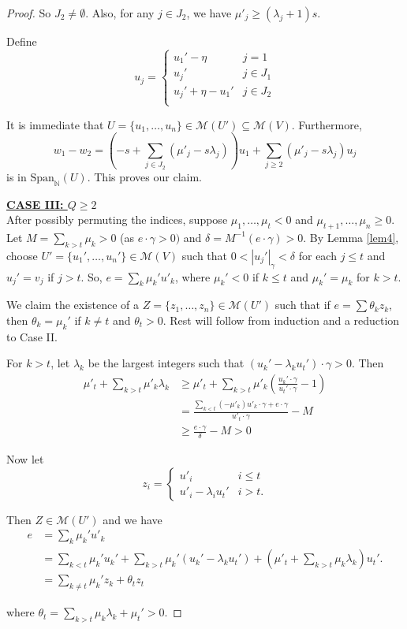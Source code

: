 \documentclass[notitlepage, 10pt]{article}
\theoremstyle{defin}
\theoremstyle{theo}
\theoremstyle{rema}
\newcommand{\N}{\mathbb{N}}
\newcommand{\cM}{\mathcal{M}}
\begin{document}
\begin{proof}
So $J_2\neq \emptyset$. Also, for any $j\in J_2$, we have $\mu'_j \geq (\lambda_j+1)s$.

Define
$$u_j = \begin{cases}
    u_1' -\eta & j=1 \\
    u_j' & j\in J_1\\
    u_j'+\eta - u_1' & j\in J_2 \\
\end{cases}$$

It is immediate that $U =\{u_1,\ldots, u_n\} \in \cM(U')\subseteq \cM(V)$. Furthermore, 
$$w_1 - w_2 = \left(-s+\sum_{j\in J_2} (\mu'_j  - s\lambda_j)\right)  u_1 +\sum_{j\geq 2} (\mu'_j  - s\lambda_j)u_j$$
is in $\mathrm{Span}_\N(U)$. This proves our claim.

\underline{\textbf{CASE III: $Q\geq 2$}} \\
After possibly permuting the indices, suppose $\mu_1,\ldots, \mu_t<0$ and $\mu_{t+1},\ldots, \mu_n\geq 0$. Let $M=\sum_{k>t}\mu_k>0$ (as $e\cdot \gamma>0)$ and $\delta = {M}^{-1}(e\cdot \gamma)>0$. By Lemma \ref{lem4}, choose $U'=\{u_1',\ldots,u_n'\}\in \cM(V)$ such that $0<|u_j'|_\gamma<\delta$ for each $j\leq t$ and $u_j'=v_j$ if $j>t$. So, $e = \sum_k \mu_k'u'_k$, where $\mu_k'<0$ if $k\leq t$ and $\mu_k'=\mu_k$ for $k>t$.

We claim the existence of a $Z =\{z_1,\ldots,z_n\} \in \cM(U')$ such that if 
$e = \sum \theta_k z_k$, then $\theta_k=\mu_k'$ if $k\neq t$ and $\theta_t > 0$. Rest will follow from induction and a reduction to Case II.

For $k>t$, let $\lambda_k$ be the largest integers such that $(u_k' - \lambda_k u_t')\cdot \gamma >0$. Then
\begin{align*}
    \mu'_t+\sum_{k>t} \mu'_k\lambda_k &\geq \mu'_t+\sum_{k>t} \mu'_k\left(\frac{u_k'\cdot \gamma}{u_t'\cdot \gamma}-1\right) \\
    &= \frac{\sum_{k<t} (-\mu'_k)u'_k\cdot \gamma + e\cdot \gamma }{u'_t\cdot \gamma} - M \\
    &\geq \frac{e\cdot \gamma}{\delta } - M > 0 
\end{align*}

Now let 
$$z_i = \begin{cases}
    u'_i & i\leq t \\
    u'_i - \lambda_iu_t' & i>t.
\end{cases} $$

Then $Z\in \cM(U')$ and we have
\begin{align*}
    e &= \sum_k \mu_k'u'_k \\
    &= \sum_{k<t} \mu_k'u_k'+ \sum_{k>t} \mu_k'(u_k'- \lambda_k u_t') + \left(\mu'_t+\sum_{k> t}\mu_k\lambda_k\right) u_t'. \\
    & = \sum_{k\neq t} \mu_k' z_k + \theta_t z_t
\end{align*}

where $\theta_t = \sum_{k>t}\mu_k\lambda_k + \mu_t' > 0$. 
\end{proof}
\end{document}
